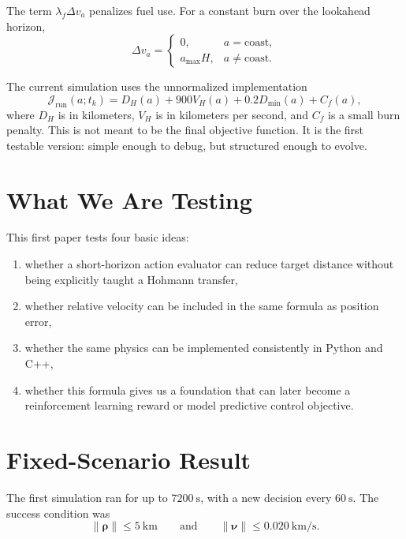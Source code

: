 \documentclass[11pt]{article}
\begin{document}
The term \(\lambda_f \Delta v_a\) penalizes fuel use.
For a constant burn over the lookahead horizon,
\[
    \Delta v_a =
    \begin{cases}
    0, & a = \text{coast}, \\
    a_{\max}H, & a \neq \text{coast}.
    \end{cases}
\]

The current simulation uses the unnormalized implementation
\[
    \mathcal J_{\mathrm{run}}(a;t_k)
    =
    D_H(a)
    +
    900 V_H(a)
    +
    0.2 D_{\min}(a)
    +
    C_f(a),
\]
where \(D_H\) is in kilometers, \(V_H\) is in kilometers per second, and \(C_f\) is a small burn penalty.
This is not meant to be the final objective function.
It is the first testable version: simple enough to debug, but structured enough to evolve.

\section{What We Are Testing}

This first paper tests four basic ideas:

\begin{enumerate}
    \item whether a short-horizon action evaluator can reduce target distance without being explicitly taught a Hohmann transfer,
    \item whether relative velocity can be included in the same formula as position error,
    \item whether the same physics can be implemented consistently in Python and C++,
    \item whether this formula gives us a foundation that can later become a reinforcement learning reward or model predictive control objective.
\end{enumerate}

\section{Fixed-Scenario Result}

The first simulation ran for up to \(7200~\mathrm{s}\), with a new decision every \(60~\mathrm{s}\).
The success condition was
\[
    \|\boldsymbol\rho\| \leq 5~\mathrm{km}
    \qquad \text{and} \qquad
    \|\boldsymbol\nu\| \leq 0.020~\mathrm{km/s}.
\]
\end{document}

